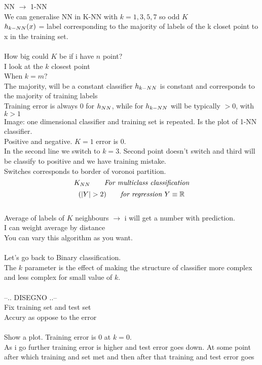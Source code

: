 \documentclass[../main.tex]{subfiles}
\begin{document}
NN $\rightarrow$ 1-NN\\
We can generalise NN in K-NN with $k = 1,3,5,7$ so odd $K$ \\
$h_{k-NN}(x)$ = label corresponding to the majority of labels of the k closet point to
x in the training set.\\\\
How big could $K$ be if i have $n$ point?\\
I look at the $k$ closest point\\
When $k = m$?\\
The majority, will be a constant classifier
$h_{k-NN}$ is constant and corresponds to the majority of training labels\\
Training error is always 0 for $h_{NN}$, while for $h_{k-NN}$ will be typically $>0$, with $k >
1$\\
Image: one dimensional classifier and training set is repeated.
Is the plot of 1-NN classifier.\\
Positive and negative.
$K = 1$ error is 0.\\
In the second line we switch to $k =3$. Second point doesn’t switch and third will
be classify to positive and we have training mistake.\\
Switches corresponds to border of voronoi partition.
$$K_{NN} \qquad \textit{For multiclass classification}$$
$$
(|Y| > 2 ) \qquad \textit{for regression } Y\equiv \mathbb{R}
$$
\\
Average of labels of $K$ neighbours $\rightarrow$ i will get a number with prediction.
\\
I can weight average by distance
\\
You can vary this algorithm as you want.\\\\
Let’s go back to Binary classification.\\
The $k$ parameter is the effect of making the structure of classifier more
complex and less complex for small value of $k$.\\\\
--.. DISEGNO ..--
\\
Fix training set and test set\\
Accury as oppose to the error
\\\\
Show a plot. Training error is 0 at $k = 0$.\\
As i go further training error is higher and test error goes down. At some point
after which training and set met and then after that training and test error goes
\end{document}
